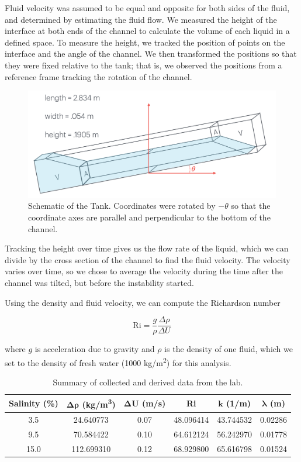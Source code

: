 \documentclass{article}
\begin{document}
Fluid velocity was assumed to be equal and opposite for both sides of the fluid,
and determined by estimating the fluid flow. We measured the height of the
interface at both ends of the channel to calculate the volume of each liquid in
a defined space. To measure the height, we tracked the position of points on the
interface and the angle of the channel. We then transformed the positions so
that they were fixed relative to the tank; that is, we observed the positions
from a reference frame tracking the rotation of the channel.
\begin{figure}[h]
    \centering
    \includegraphics[width=5in]{tank-schematic.png}
    \caption{Schematic of the Tank. Coordinates were rotated by $-\theta$ so that the coordinate axes are parallel and perpendicular to the bottom of the channel.}
    \label{img:tank-schematic}
\end{figure}
Tracking the height
over time gives us the flow rate of the liquid, which we can divide by the cross
section of the channel to find the fluid velocity. The velocity varies over
time, so we chose to average the velocity during the time after the channel was
tilted, but before the instability started.

Using the density and fluid velocity, we can compute the Richardson number

\[ \text{Ri} = \frac{g}{\rho} \frac{\Delta \rho}{\Delta U} \]

where \(g\) is acceleration due to gravity and \(\rho\) is the density of one fluid, which we set to the density of fresh water (1000 kg/m\textsuperscript{2}) for this analysis.

\begin{table}[h!]
    \centering
    \begin{tabular}{|c|c|c|c|c|c|}
    \hline
    \textbf{Salinity (\%)} & $\bm{\Delta \rho}$ \textbf{(kg/m\textsuperscript{3})} & $\bm{\Delta U}$ \textbf{(m/s)}& \textbf{Ri} & $\bm{k}$ \textbf{(1/m)}& $\bm{\lambda}$ \textbf{(m)}\\ \hline
    3.5 & 24.640773 & 0.07 & 48.096414 & 43.744532 & 0.02286 \\ \hline
    9.5 & 70.584422 & 0.10 & 64.612124 & 56.242970 & 0.01778 \\ \hline
    15.0 & 112.699310 & 0.12 & 68.929800 & 65.616798 & 0.01524 \\ \hline
    \end{tabular}
    \caption{Summary of collected and derived data from the lab.}
    \label{tab:data}
\end{table}
\end{document}
